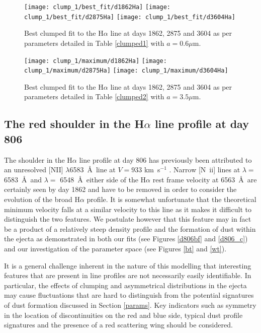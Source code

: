 \begin{figure*}
\begin{center}
\texttt{[image: clump\_1/best\_fit/d1862Ha]}
\texttt{[image: clump\_1/best\_fit/d2875Ha]}
\texttt{[image: clump\_1/best\_fit/d3604Ha]}
\caption{Best clumped fit to the H$\alpha$ line at days 1862, 2875 and 
3604 as per parameters detailed in Table \ref{clumped1} with $a=0.6\mu$m.}
\label{d1862_3604_c}
\texttt{[image: clump\_1/maximum/d1862Ha]}
\texttt{[image: clump\_1/maximum/d2875Ha]}
\texttt{[image: clump\_1/maximum/d3604Ha]}
\caption{Best clumped fit to the H$\alpha$ line at days 1862, 2875 and 
3604 as per parameters detailed in Table \ref{clumped2} with $a=3.5\mu$m.}
\label{d1862_3604_cmax}
\end{center}
\end{figure*}

\subsection{The red shoulder in the H$\alpha$ line profile at day 806}

The shoulder in the H$\alpha$ line profile at day 806 has previously been 
attributed to an unresolved [NII] $\lambda$6583~\AA\ line at $V=933$ 
km~s$^{-1}$ \citep{Kozma1997}.  Narrow [N~{\sc ii}] lines at $\lambda=$ 
6583~\AA\ and $\lambda=$ 6548~\AA\ either side of the H$\alpha$ rest frame
 velocity at 6563~\AA\ are certainly seen by day 1862 and have to be 
removed in order to consider the evolution of the broad H$\alpha$ profile. 
It is somewhat unfortunate that the theoretical minimum velocity falls at 
a similar velocity to this line as it makes it difficult to distinguish 
the two features.  We postulate however that this feature may in fact be a 
product of a relatively steep density profile and the formation of dust 
within the ejecta as demonstrated in both our fits (see Figures 
\ref{d806bf} and \ref{d806_c}) and our investigation of the parameter 
space (see Figures \ref{bt} and \ref{wt}).

It is a general challenge inherent in the nature of this modelling that 
interesting features that are present in line profiles are not necessarily 
easily identifiable.  In particular, the effects of clumping and 
asymmetrical distributions in the ejecta may cause fluctuations that are 
hard to distinguish from the potential signatures of dust formation 
discussed in Section \ref{params}.  Key indicators such as symmetry in the 
location of discontinuities on the red and blue side, typical dust profile 
signatures and the presence of a red scattering wing should be considered.


